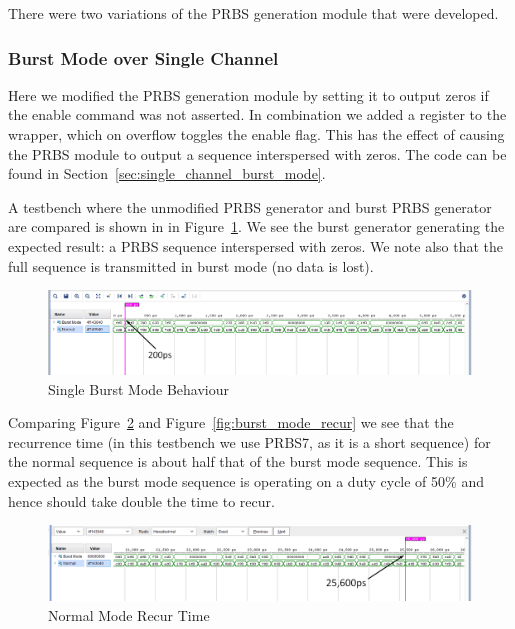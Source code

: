 \noindent There were two variations of the PRBS generation module that were developed.

\subsubsection{Burst Mode over Single Channel}%
\label{ssub:burst_mode_over_single_channel}
Here we modified the PRBS generation module by setting it to output zeros if the
enable command was not asserted.  In combination we added a register
to the wrapper, which on overflow toggles the enable flag. This has the
effect of causing the PRBS module to output a sequence interspersed with zeros.
The code can be found in Section~\ref{sec:single_channel_burst_mode}.

A testbench where the unmodified PRBS generator and burst PRBS generator
are compared is shown in in Figure~\ref{fig:burst_mode_start}.  We see the
burst generator generating the expected result: a PRBS sequence interspersed
with zeros. We note also that the full sequence is transmitted in burst mode (no
data is lost).

\begin{figure}[ht]
    \centering
    \hspace*{-3cm}\includegraphics[width=1.4\linewidth]{img/burst_mode_1.png}
    \caption{Single Burst Mode Behaviour}%
    \label{fig:burst_mode_start}
\end{figure}

Comparing Figure~\ref{fig:normal_mode_recur} and
Figure~\ref{fig:burst_mode_recur} we see that the recurrence time (in this
testbench we use PRBS7, as it is a short sequence) for the normal sequence is
about half that of the burst mode sequence. This is expected as the burst mode
sequence is operating on a duty cycle of 50\% and hence should take double the
time to recur.

\begin{figure}[ht]
    \centering
    \hspace*{-3cm}\includegraphics[width=1.4\linewidth]{img/burst_mode_2.png}
    \caption{Normal Mode Recur Time}%
    \label{fig:normal_mode_recur}
\end{figure}

